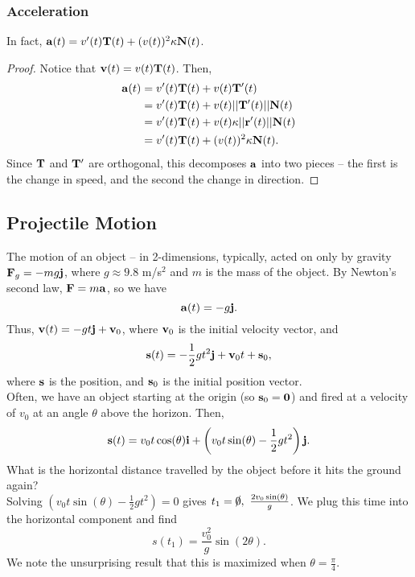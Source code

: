 \subsubsection{Acceleration}

In fact, \(\mathbf{a}(t) = v'(t)\mathbf{T}(t) + (v(t))^{2}\kappa\mathbf{N}(t)\).

\begin{proof}
    Notice that \(\mathbf{v}(t) = v(t)\mathbf{T}(t)\). Then,
    \begin{align*}
        \mathbf{a}(t) &= v'(t)\mathbf{T}(t) + v(t)\mathbf{T}'(t) \\
        &= v'(t)\mathbf{T}(t) + v(t)||\mathbf{T}'(t)||\mathbf{N}(t) \\
        &= v'(t)\mathbf{T}(t) + v(t)\kappa||\mathbf{r}'(t)||\mathbf{N}(t) \\
        &= v'(t)\mathbf{T}(t) + (v(t))^{2}\kappa\mathbf{N}(t).
    \end{align*}
    Since \(\mathbf{T}\) and \(\mathbf{T}'\) are orthogonal, this decomposes \(\mathbf{a}\) into two pieces -- the first is the change in speed, and the second the change in direction.
\end{proof}

\subsection{Projectile Motion}

The motion of an object -- in 2-dimensions, typically, acted on only by gravity \(\mathbf{F}_{g} = -mg\mathbf{j}\), where \(g \approx 9.8\) m/s\(^{2}\) and \(m\) is the mass of the object. By Newton's second law, \(\mathbf{F} = m\mathbf{a}\), so we have 
\[
    \mathbf{a}(t) = - g\mathbf{j}.
\]
Thus, \(\mathbf{v}(t) = -gt\mathbf{j} + \mathbf{v}_{0}\), where \(\mathbf{v}_{0}\) is the initial velocity vector, and
\[
    \mathbf{s}(t) = -\frac{1}{2}gt^{2}\mathbf{j} + \mathbf{v}_{0}t + \mathbf{s}_{0},
\]
where \(\mathbf{s}\) is the position, and \(\mathbf{s}_{0}\) is the initial position vector. \\

Often, we have an object starting at the origin (so \(\mathbf{s}_{0} = \mathbf{0}\)) and fired at a velocity of \(v_{0}\) at an angle \(\theta\) above the horizon. Then,
\[  
    \mathbf{s}(t) = v_{0}t\cos(\theta)\mathbf{i} + \left(v_{0}t\sin(\theta) - \frac{1}{2}gt^{2}\right)\mathbf{j}.
\]
What is the horizontal distance travelled by the object before it hits the ground again? \\

Solving \((v_{0}t\sin(\theta) - \frac{1}{2}gt^{2}) = 0\) gives \(t_{1} = \slashed{0}, \ \frac{2v_{0}\sin(\theta)}{g}\). We plug this time into the horizontal component and find 
\[
    s(t_{1}) = \frac{v_{0}^{2}}{g}\sin(2\theta).
\]
We note the unsurprising result that this is maximized when \(\theta = \frac{\pi}{4}\).

